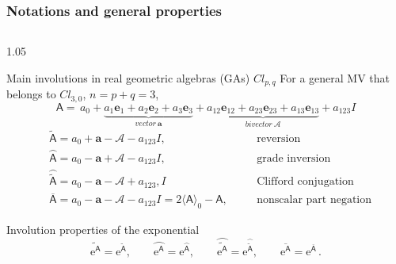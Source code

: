 \documentclass[xcolor=table,hyperref={pdfpagemode=FullScreen}]{beamer}
\newcommand{\ee}{\mathrm{e}} %
\newcommand{\cl}[2]{\ensuremath{\mathit{Cl}_{#1,#2}}} %
\newcommand{\e}[1]{\mathbf{e}_{#1}} %
\def\m#1{\mathsf{#1}} %
\newcommand{\reverse}[1]{\widetilde{#1}}
\newcommand{\gradeinverse}[1]{\wideparen{#1}}
\newcommand{\cliffordconjugate}[1]{\wideparen{\widetilde{#1}}}
\def\A{\mathsf{A}}
\def\m#1{\mathsf{#1}}%
\newcommand{\ba}{\ensuremath{\mathbf{a}}}
\newcommand{\cA}{\ensuremath{\mathcal{A}}}
\begin{document}
\begin{frame}
  \frametitle<presentation>{Notations and general properties}
\vskip -20pt
\begin{columns}[t]
\begin{column}{1.05\textwidth}
\begin{block}{Main involutions in real geometric algebras (GAs) $\cl{p}{q}$}
For a general MV that belongs to  $\cl{3}{0}$,
$n=p+q= 3$,
\begin{equation*}
\A=\,a_0+\underbrace{a_1\mathbf{e}_1+a_2\e{2}+a_3\e{3}}_{vector\
\ba}+
\underbrace{a_{12}\e{12}+a_{23}\e{23}+a_{13}\e{13}}_{bivector\
\cA}+a_{123}I
\end{equation*}
\begin{align*}
  &\reverse{\m{A}}=a_0+\ba-\cA-a_{123}I,&&\quad\text{reversion}\\
  &\gradeinverse{\m{A}}=a_0-\ba+\cA-a_{123}I,&&\quad\text{grade inversion}\\
  &\cliffordconjugate{\m{A}}=a_0-\ba-\cA+a_{123},I&&\quad\text{Clifford
conjugation}\\
  &\overline{\m{A}}=a_0-\ba-\cA-a_{123}I=2\langle\m{A}\rangle_{0}-\m{A},&&\quad\text{nonscalar part negation}
\end{align*}
\end{block}
\begin{block}{Involution properties  of  the exponential}
\begin{equation*}
\reverse{\ee^{\m{A}}}=\ee^{\reverse{\m{A}}},\qquad\gradeinverse{\ee^{\m{A}}}=\ee^{\gradeinverse{\m{A}}},
\qquad \cliffordconjugate{\ee^{\m{A}}}=\ee^{\cliffordconjugate{\m{A}}},
  \qquad \overline{\ee^{\m{A}}}=\ee^{\overline{\m{A}}}\,.
\end{equation*}
\end{block}
\end{column}
\end{columns}
\end{frame}
\end{document}
